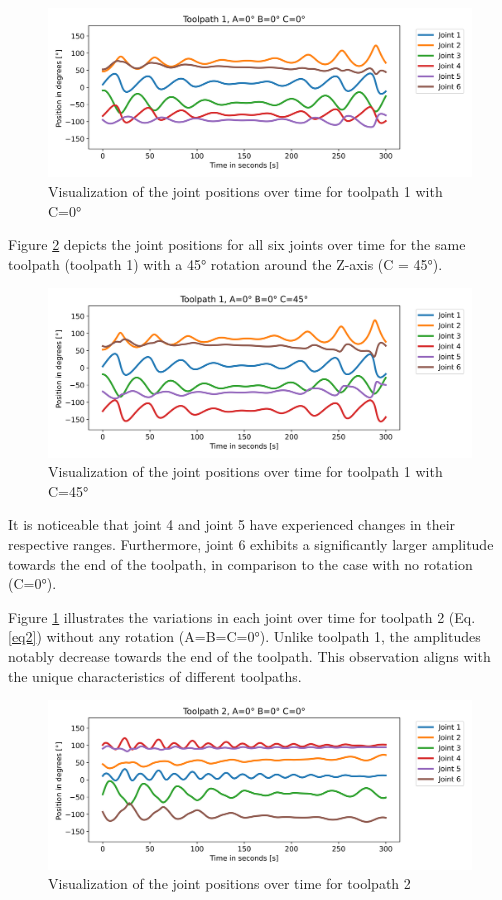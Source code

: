 \begin{figure}[H]
	\centerline{\includegraphics[width=1\textwidth]{figures/TP1ABC0.png}}
	\caption{Visualization of the joint positions over time for toolpath 1 with C=0°}
	\label{TP1ABC0}
\end{figure}

Figure \ref{TP1ABC45} depicts the joint positions for all six joints over time for the same toolpath (toolpath 1) with a 45° rotation around the Z-axis (C = 45°). 
\begin{figure}[H]
	\centerline{\includegraphics[width=1\textwidth]{figures/TP1ABC45.png}}
	\caption{Visualization of the joint positions over time for toolpath 1 with C=45°}
	\label{TP1ABC45}
\end{figure}
\newpage
It is noticeable that joint 4 and joint 5 have experienced changes in their respective ranges. Furthermore, joint 6 exhibits a significantly larger amplitude towards the end of the toolpath, in comparison to the case with no rotation (C=0°).

Figure \ref{TP1ABC0} illustrates the variations in each joint over time for toolpath 2 (Eq. \ref{eq2}) without any rotation (A=B=C=0°). Unlike toolpath 1, the amplitudes notably decrease towards the end of the toolpath. This observation aligns with the unique characteristics of different toolpaths.
 
\begin{figure}[H]
	\centerline{\includegraphics[width=1\textwidth]{figures/TP2ABC0.png}}
	\caption{Visualization of the joint positions over time for toolpath 2}
	\label{TP2ABC0}
\end{figure}

